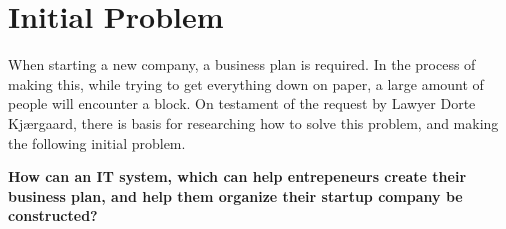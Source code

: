 \section{Initial Problem}
When starting a new company, a business plan is required. In the process of making this, while trying to get everything down on paper, a large amount of people will encounter a block. On testament of the request by Lawyer Dorte Kjærgaard, there is basis for researching how to solve this problem, and making the following initial problem. 

\textbf{How can an IT system, which can help entrepeneurs create their business plan, and help them organize their startup company be constructed?}